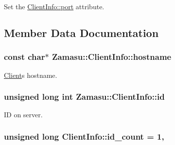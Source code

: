 Set the \hyperlink{class_zamasu_1_1_client_info_a0072d23fd63fbd8e831556940bd69ce1}{Client\+Info\+::port} attribute. 



\subsection{Member Data Documentation}
\subsubsection[{\texorpdfstring{hostname}{hostname}}]{\setlength{\rightskip}{0pt plus 5cm}const char$\ast$ Zamasu\+::\+Client\+Info\+::hostname\hspace{0.3cm}{\ttfamily [protected]}}\hypertarget{class_zamasu_1_1_client_info_a97baa615785948d4f8bc1f31af9ed056}{}\label{class_zamasu_1_1_client_info_a97baa615785948d4f8bc1f31af9ed056}


\hyperlink{class_zamasu_1_1_client}{Client}\textquotesingle{}s hostname. 

\subsubsection[{\texorpdfstring{id}{id}}]{\setlength{\rightskip}{0pt plus 5cm}unsigned long int Zamasu\+::\+Client\+Info\+::id\hspace{0.3cm}{\ttfamily [protected]}}\hypertarget{class_zamasu_1_1_client_info_a70071ec83c0aeca5dbfdfb539ac0c989}{}\label{class_zamasu_1_1_client_info_a70071ec83c0aeca5dbfdfb539ac0c989}


ID on server. 

\subsubsection[{\texorpdfstring{id\+\_\+count}{id_count}}]{\setlength{\rightskip}{0pt plus 5cm}unsigned long Client\+Info\+::id\+\_\+count = 1\hspace{0.3cm}{\ttfamily [static]}, {\ttfamily [protected]}}\hypertarget{class_zamasu_1_1_client_info_a61083b34d39143869cda9bb1ca7aa323}{}\label{class_zamasu_1_1_client_info_a61083b34d39143869cda9bb1ca7aa323}



